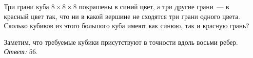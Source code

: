 Три грани куба $8 \times 8 \times 8$ покрашены в синий цвет, а три другие
грани~--- в красный цвет так, что ни в какой вершине не сходятся три грани
одного цвета.
Сколько кубиков из этого большого куба имеют как синюю, так и красную грань?

\solution
Заметим, что требуемые кубики присутствуют в точности вдоль восьми ребер.
\emph{Ответ:} 56.

